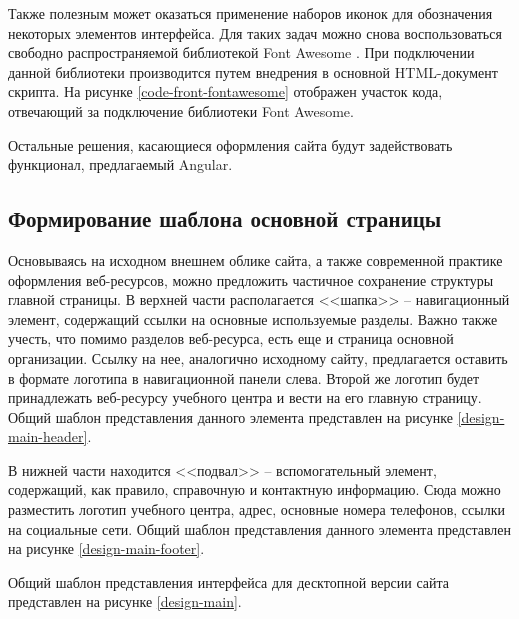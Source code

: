 
Также полезным может оказаться применение наборов иконок для обозначения некоторых элементов интерфейса.
Для таких задач можно снова воспользоваться свободно распространяемой библиотекой Font Awesome \cite{fontawesome}.
При подключении данной библиотеки производится путем внедрения в основной HTML-документ скрипта.
На рисунке \ref{code-front-fontawesome} отображен участок кода, отвечающий за подключение библиотеки Font Awesome.


Остальные решения, касающиеся оформления сайта будут задействовать функционал, предлагаемый Angular.

\subsection{Формирование шаблона основной страницы}

Основываясь на исходном внешнем облике сайта, а также современной практике оформления веб-ресурсов, можно предложить частичное сохранение структуры главной страницы.
В верхней части располагается <<шапка>> -- навигационный элемент, содержащий ссылки на основные используемые разделы.
Важно также учесть, что помимо разделов веб-ресурса, есть еще и страница основной организации.
Ссылку на нее, аналогично исходному сайту, предлагается оставить в формате логотипа в навигационной панели слева.
Второй же логотип будет принадлежать веб-ресурсу учебного центра и вести на его главную страницу.
Общий шаблон представления данного элемента представлен на рисунке \ref{design-main-header}.

В нижней части находится <<подвал>> -- вспомогательный элемент, содержащий, как правило, справочную и контактную информацию.
Сюда можно разместить логотип учебного центра, адрес, основные номера телефонов, ссылки на социальные сети.
Общий шаблон представления данного элемента представлен на рисунке \ref{design-main-footer}.

Общий шаблон представления интерфейса для десктопной версии сайта представлен на рисунке \ref{design-main}.


